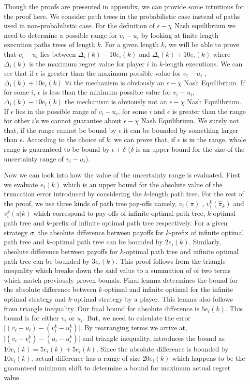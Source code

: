 Though the proofs are presented in appendix, we can provide some intuitions for the proof here. We consider path trees in the probabilistic case instead of paths used in non-probabilistic case.
For the definition of $\epsilon - \chi$ Nash equilibrium we need to determine a possible range for $v_i - u_i$ by looking at finite length execution paths trees of length $k$. For a given length $k$, we will be able to prove that $v_i - u_i$ lies between $\Delta_i(k) - 10e_i(k)$ and $\Delta_i(k) + 10e_i(k)$ where $\Delta_i(k)$ is the maximum regret value for player $i$ in $k$-length executions. We can see that if $\epsilon$ is greater than the maximum possible value for $v_i - u_i$ , $\Delta_i(k) + 10e_i(k)$  $\forall i$ the mechanism is obviously an $\epsilon - \chi$ Nash Equilibrium. If for some $i$, $\epsilon$ is less than the minimum possible value for  $v_i - u_i$, $\Delta_i(k) - 10e_i(k)$ the mechanism is obviously not an $\epsilon - \chi$ Nash Equilibrium. If $\epsilon$ lies in the possible range of $v_i - u_i$,  for some $i$ and $\epsilon$ is greater than the range for other $i$'s we cannot guarantee about $\epsilon - \chi$ Nash Equilibrium. We surely not that, if the range cannot be bound by $\epsilon$ it can be bounded by something larger than $\epsilon$. According to the choice of $k$, we can prove that, if $\epsilon$ is in the range, whole range is guaranteed to be bound by $\epsilon + \delta$ ($\delta$ is an upper bound for the size of the uncertainty range of $v_i - u_i$). \newline

Now we can look into how the value of the uncertainty range is evaluated. First we evaluate $e_i(k)$ which is an upper bound for the absolute value of the truncation error introduced by considering the $k$-length path tree. For the rest of the proof, we use three kinds of path tree pay-offs namely, $v_i(\pi)$ , $v_i^{k}(\hat{\pi}_k)$ and $v_i^{k}(\pi \vert k)$ which correspond to pay-offs of infinite optimal path tree, $k$-optimal path tree and $k$-prefix of infinite optimal path tree respectively. For a given strategy $\sigma$, the absolute difference between payoffs for $k$-prefix of infinite optimal path tree and $k$-optimal path tree can be bounded by $2e_i(k)$. Similarly, absolute difference between payoffs for $k$-optimal path tree and infinite optimal path tree can be bounded by $3e_i(k)$. This proof follows from the triangle inequality which breaks down the said value to a summation of of two terms which match previously proven bounds. Final lemma determines the bound for the absolute difference between $k$-optimal and infinite optimal for the infinite optimal strategy and $k$-optimal strategy by a player. This lemma also follows from triangle inequality. Our final bound for absolute difference is $5e_i(k)$. This bound is for either $v_i$ or $u_i$. But, we need to calculate the error $\vert (v_i - u_i) - (v^{k}_i - u^{k}_i ) \vert$. By rearranging terms we arrive at,  $\vert (v_i - v^{k}_i) - (u_i - u^{k}_i ) \vert$ and triangle inequality, introduces the bound as $10e_i(k) = 5e_i(k) + 5e_i(k)$. Since the absolute difference is bounded by $10e_i(k)$, actual difference has a range of size $20e_i(k)$ which happens to be the guaranteed minimum shift to determine a bound for maximum actual regret value.


